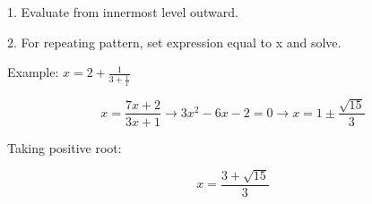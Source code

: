 1. Evaluate from innermost level outward.

2. For repeating pattern, set expression equal to x and solve.

Example: $x = 2 + \frac{1}{3 + \frac{1}{x}}$

$$ x = \frac{7x+2}{3x+1} \rightarrow 3x^2-6x-2=0 \rightarrow x = 1 \pm \frac{\sqrt{15}}{3} $$

Taking positive root:

$$ x = \frac{3+\sqrt{15}}{3} $$
